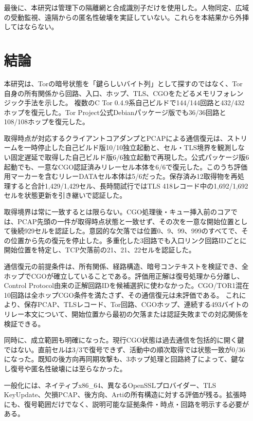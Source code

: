 \documentclass[10pt,a4paper]{ltjsarticle}
\newcommand{\torone}{\textsc{TOR1}}
\begin{document}
最後に、本研究は管理下の隔離網と合成識別子だけを使用した。人物同定、広域の受動監視、遠隔からの匿名性破壊を実証していない。これらを本結果から外挿してはならない。

\section{結論}

本研究は、Torの暗号状態を「鍵らしいバイト列」として探すのではなく、Tor自身の所有関係から回路、入口、ホップ、TLS、CGOをたどるメモリフォレンジック手法を示した。
複数のC Tor 0.4.9系自己ビルドで144/144回路と432/432ホップを復元した。Tor Project公式Debianパッケージ版でも36/36回路と108/108ホップを復元した。

取得時点が対応するクライアントコアダンプとPCAPによる通信復元は、ストリームを一時停止した自己ビルド版10/10独立起動と、セル・TLS境界を観測しない固定遅延で取得した自己ビルド版6/6独立起動で再現した。公式パッケージ版6起動でも、一意なCGO認証済みリレーセル本体を6/6で復元した。このうち評価用マーカーを含むリレーDATAセル本体は5/6だった。保存済み12取得物を再処理すると合計1,429/1,429セル、長時間試行ではTLS 418レコード中の1,692/1,692セルを状態更新を引き継いで認証した。

取得境界は常に一致するとは限らない。CGO処理後・キュー挿入前のコアでは、PCAP先頭の一件が取得時点状態と一致せず、その次を一意な開始位置として後続929セルを認証した。意図的な欠落では位置0、9、99、999のすべてで、その位置から先の復元を停止した。多重化した3回路でも入口リンク回路IDごとに開始位置を特定し、TCP欠落前の21、21、22セルを認証した。

通信復元の前提条件は、所有関係、経路構造、暗号コンテキストを検証でき、全ホップでCGOが確立していることである。評価用正解は復号処理から分離し、Control Protocol由来の正解回路IDを候補選択に使わなかった。CGO/\torone{}混在10回路は全ホップCGO条件を満たさず、その通信復元は未評価である。
これにより、保存PCAP、TLSレコード、Tor回路、CGOホップ、連続する493バイトのリレー本文について、開始位置から最初の欠落または認証失敗までの対応関係を検証できる。

同時に、成立範囲も明確になった。現行CGO状態は過去通信を包括的に開く鍵ではない。直前セルは3/3で復号できず、活動中の順次取得では状態一致が0/36になった。既知の後方向再同期攻撃も、3ホップ処理と回路終了によって、鍵なし復号や匿名性破壊には至らなかった。

一般化には、ネイティブx86\_64、異なるOpenSSLプロバイダー、TLS KeyUpdate、欠損PCAP、後方向、Artiの所有構造に対する評価が残る。拡張時にも、復号範囲だけでなく、説明可能な証拠条件・時点・回路を明示する必要がある。

\printbibliography[title={参考文献}]
\end{document}
